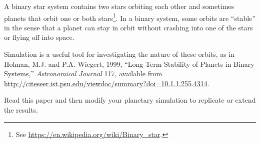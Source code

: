 \documentclass{book}
\begin{document}
\begin{ex}
\label{binary}

A binary star system contains two stars orbiting each other and
sometimes planets that orbit one or both stars\footnote{See
\url{https://en.wikipedia.org/wiki/Binary_star}.}.  In a binary
system, some orbits are ``stable'' in the sense that a planet can stay
in orbit without crashing into one of the stars or flying off into
space.

Simulation is a useful tool for investigating the nature of these
orbits, as in Holman, M.J. and P.A. Wiegert, 1999, ``Long-Term Stability
of Planets in Binary Systems,''  {\em Astronomical Journal} 117, 
available from \url{http://citeseer.ist.psu.edu/viewdoc/summary?doi=10.1.1.255.4314}.

Read this paper and then modify your planetary simulation to
replicate or extend the results.
\end{ex}

\newpage


\end{document}
